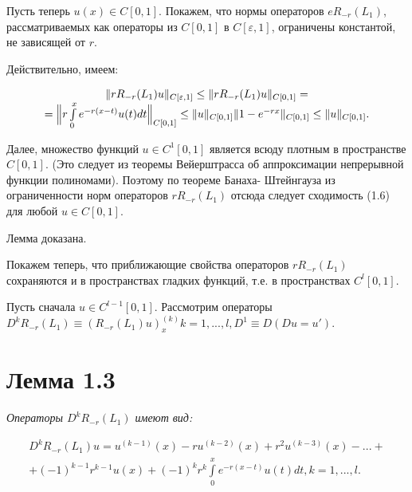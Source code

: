 Пусть теперь $ u(x) \in C[0,1] $. Покажем, что нормы операторов $ eR_{-r}(L_1) $, рассматриваемых как операторы из $  C[0,1] $ в $ C[\varepsilon,1] $, ограничены константой, не зависящей от $ r $.

Действительно, имеем:

\begin{equation}
\begin{array}{c}

\Vert rR_{-r}(L_1)u \Vert_{C[\varepsilon,1]} \leq \Vert rR_{-r}(L_1)u \Vert_{C[0,1]} = \\
= \Bigl\Vert r\int\limits_0^x e^{-r(x-t)}u(t)dt\Bigr\Vert_{C[0,1]} \leq \Vert u\Vert_{C[0,1]}\Vert 1 - e^{-rx}\Vert_{C[0,1]} \leq \Vert u \Vert_{C[0,1]}.

\end{array}
\end{equation}

Далее, множество функций $ u \in C^1[0,1] $ является всюду плотным в пространстве $ C[0,1] $. (Это следует из теоремы Вейерштрасса об аппроксимации непрерывной функции полиномами). Поэтому по теореме Банаха- Штейнгауза из ограниченности норм операторов $ rR_{-r}(L_1) $ отсюда следует сходимость (1.6) для любой $ u \in C[0,1] $.

Лемма доказана.

Покажем теперь, что приближающие свойства операторов $ rR_{-r}(L_1) $ сохраняются и в пространствах гладких функций, т.е. в пространствах $ C^l[0,1] $.

Пусть сначала $ u \in C^{l-1}[0,1] $. Рассмотрим операторы $ D^kR_{-r}(L_1) \equiv (R_{-r}(L_1)u)_x^{(k)} k = 1,...,l, D^1 \equiv D (Du = u')$.

\section{Лемма 1.3}
\label{lemma1.3}

\textit{Операторы $ D^kR_{-r}(L_1) $ имеют вид:}

\begin{equation}
\begin{array}{c}

D^kR_{-r}(L_1)u = u^{(k-1)}(x) - ru^{(k-2)}(x) + r^2u^{(k-3)}(x) - ... + \\
+ (-1)^{k-1}r^{k-1}u(x) + (-1)^kr^k\int\limits_0^x e^{-r(x-t)}u(t)dt, k = 1,...,l.

\end{array}
\end{equation}

